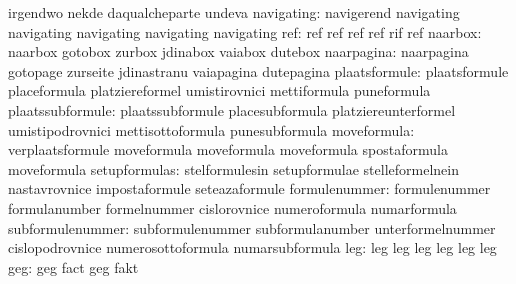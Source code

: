                                   irgendwo                         nekde
                                  daqualcheparte                   undeva
navigating: navigerend navigating
            navigating navigating
            navigating navigating
                             ref: ref                              ref
                                  ref                              ref
                                  rif                              ref
                         naarbox: naarbox                          gotobox
                                  zurbox                           jdinabox
                                  vaiabox                          dutebox  %
                      naarpagina: naarpagina                       gotopage
                                  zurseite                         jdinastranu
                                  vaiapagina                       dutepagina
                   plaatsformule: plaatsformule                    placeformula
                                  platziereformel                  umistirovnici
                                  mettiformula                     puneformula
                plaatssubformule: plaatssubformule                 placesubformula
                                  platziereunterformel             umistipodrovnici
                                  mettisottoformula                punesubformula
moveformula: verplaatsformule  moveformula
             moveformula       moveformula
             spostaformula       moveformula
                   setupformulas: stelformulesin                   setupformulae
                                  stelleformelnein                 nastavrovnice
                                  impostaformule                   seteazaformule
                   formulenummer: formulenummer                    formulanumber
                                  formelnummer                     cislorovnice
                                  numeroformula                    numarformula
                subformulenummer: subformulenummer                 subformulanumber
                                  unterformelnummer                cislopodrovnice
                                  numerosottoformula               numarsubformula
                             leg: leg                              leg
                                  leg                              leg
                                  leg                              leg
                             geg: geg                              fact
                                  geg                              fakt
